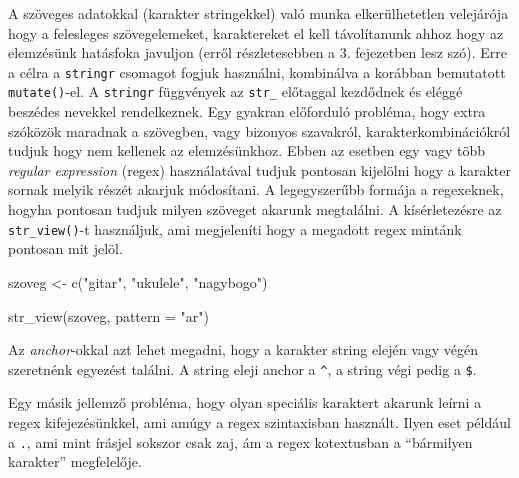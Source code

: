 \documentclass[
]{book}
\newenvironment{Shaded}{\begin{snugshade}}{\end{snugshade}}
\newcommand{\AttributeTok}[1]{\textcolor[rgb]{0.77,0.63,0.00}{#1}}
\newcommand{\FunctionTok}[1]{\textcolor[rgb]{0.00,0.00,0.00}{#1}}
\newcommand{\NormalTok}[1]{#1}
\newcommand{\OtherTok}[1]{\textcolor[rgb]{0.56,0.35,0.01}{#1}}
\newcommand{\StringTok}[1]{\textcolor[rgb]{0.31,0.60,0.02}{#1}}
\begin{document}
A szöveges adatokkal (karakter stringekkel) való munka elkerülhetetlen
velejárója hogy a felesleges szövegelemeket, karaktereket el kell
távolítanunk ahhoz hogy az elemzésünk hatásfoka javuljon (erről
részletesebben a 3. fejezetben lesz szó). Erre a célra a
\texttt{stringr} csomagot fogjuk használni, kombinálva a korábban
bemutatott \texttt{mutate()}-el. A \texttt{stringr} függvények az
\texttt{str\_} előtaggal kezdődnek és eléggé beszédes nevekkel
rendelkeznek. Egy gyakran előforduló probléma, hogy extra szóközök
maradnak a szövegben, vagy bizonyos szavakról, karakterkombinációkról
tudjuk hogy nem kellenek az elemzésünkhoz. Ebben az esetben egy vagy
több \emph{regular expression} (regex) használatával tudjuk pontosan
kijelölni hogy a karakter sornak melyik részét akarjuk módosítani. A
legegyszerűbb formája a regexeknek, hogyha pontosan tudjuk milyen
szöveget akarunk megtalálni. A kísérletezésre az \texttt{str\_view()}-t
használjuk, ami megjeleníti hogy a megadott regex mintánk pontosan mit
jelöl.

\begin{Shaded}
\begin{Highlighting}[]
\NormalTok{szoveg }\OtherTok{\textless{}{-}} \FunctionTok{c}\NormalTok{(}\StringTok{"gitar"}\NormalTok{, }\StringTok{"ukulele"}\NormalTok{, }\StringTok{"nagybogo"}\NormalTok{)}

\FunctionTok{str\_view}\NormalTok{(szoveg, }\AttributeTok{pattern =} \StringTok{"ar"}\NormalTok{)}
\end{Highlighting}
\end{Shaded}

Az \emph{anchor}-okkal azt lehet megadni, hogy a karakter string elején
vagy végén szeretnénk egyezést találni. A string eleji anchor a
\texttt{\^{}}, a string végi pedig a \texttt{\$}.

\begin{Shaded}
\end{Shaded}

Egy másik jellemző probléma, hogy olyan speciális karaktert akarunk
leírni a regex kifejezésünkkel, ami amúgy a regex szintaxisban használt.
Ilyen eset például a \texttt{.}, ami mint írásjel sokszor csak zaj, ám a
regex kotextusban a ``bármilyen karakter'' megfelelője.
\end{document}
